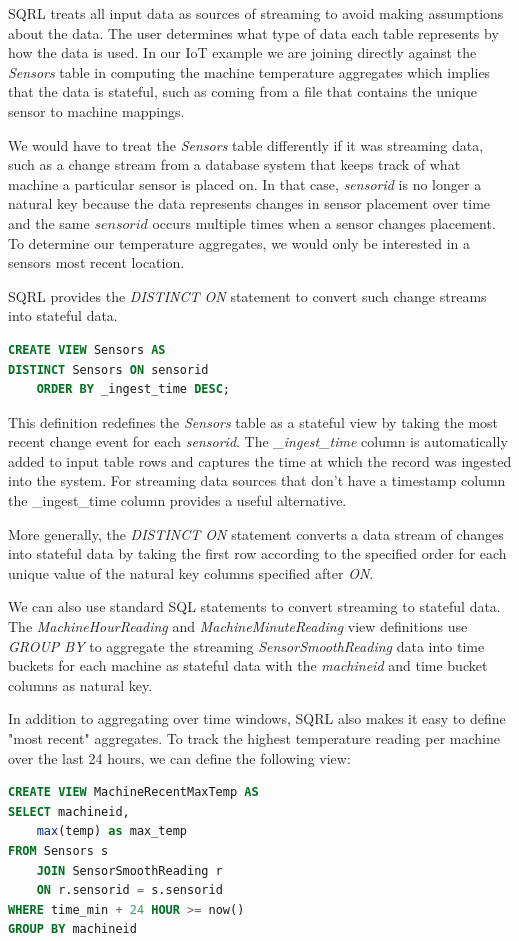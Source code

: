 \documentclass[	DIV=calc,%
							paper=letter,%
							fontsize=11pt,%
							twocolumn]{scrartcl}	 					%
\begin{document}
SQRL treats all input data as sources of streaming to avoid making assumptions about the data. The user determines what type of data each table represents by how the data is used. In our IoT example we are joining directly against the \emph{Sensors} table in computing the machine temperature aggregates which implies that the data is stateful, such as coming from a file that contains the unique sensor to machine mappings.

We would have to treat the \emph{Sensors} table differently if it was streaming data, such as a change stream from a database system that keeps track of what machine a particular sensor is placed on. In that case, \emph{sensorid} is no longer a natural key because the data represents changes in sensor placement over time and the same $sensorid$ occurs multiple times when a sensor changes placement. To determine our temperature aggregates, we would only be interested in a sensors most recent location.

SQRL provides the \emph{DISTINCT ON} statement to convert such change streams into stateful data.
\begin{lstlisting}[language=SQL]
CREATE VIEW Sensors AS
DISTINCT Sensors ON sensorid
    ORDER BY _ingest_time DESC;
\end{lstlisting}
This definition redefines the \emph{Sensors} table as a stateful view by taking the most recent change event for each \emph{sensorid}. The \emph{\_ingest\_time} column is automatically added to input table rows and captures the time at which the record was ingested into the system. For streaming data sources that don't have a timestamp column the \_ingest\_time column provides a useful alternative.

More generally, the \emph{DISTINCT ON} statement converts a data stream of changes into stateful data by taking the first row according to the specified order for each unique value of the natural key columns specified after \emph{ON}.

We can also use standard SQL statements to convert streaming to stateful data. The \emph{MachineHourReading} and \emph{MachineMinuteReading} view definitions use \emph{GROUP BY} to aggregate the streaming \emph{SensorSmoothReading} data into time buckets for each machine as stateful data with the \emph{machineid} and time bucket columns as natural key.

In addition to aggregating over time windows, SQRL also makes it easy to define "most recent" aggregates. To track the highest temperature reading per machine over the last 24 hours, we can define the following view:
\begin{lstlisting}[language=SQL]
CREATE VIEW MachineRecentMaxTemp AS
SELECT machineid,
    max(temp) as max_temp
FROM Sensors s
    JOIN SensorSmoothReading r
    ON r.sensorid = s.sensorid
WHERE time_min + 24 HOUR >= now()
GROUP BY machineid
\end{lstlisting}
\end{document}
